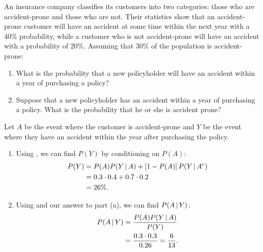 \begin{changebar}
    \begin{example}\label{insuranceconditional}
        An insurance company classifies its customers into two categories: those who are accident-prone and those who are not. Their statistics show that an accident-prone customer will have an accident at some time within the next year with a 40\% probability, while a customer who is not accident-prone will have an accident with a probability of 20\%. Assuming that 30\% of the population is accident-prone: \begin{enumerate}[label=(\alph*)]
            \item What is the probability that a new policyholder will have an accident within a year of purchasing a policy?
            \item Suppose that a new policyholder has an accident within a year of purchasing a policy. What is the probability that he or she is accident prone?
        \end{enumerate}
    \end{example}
    \begin{solution}
        Let $A$ be the event where the customer is accident-prone and $Y$ be the event where they have an accident within the year after purchasing the policy.
        \begin{enumerate}[label=(\alph*)]
            \item Using , we can find $P(Y)$ by conditioning on $P(A)$: \[
                    \begin{aligned}
                        P(Y) &= P(A)P(Y \,\vert\, A) + \left[ 1 - P(A) \right]P(Y \,\vert\, A^c) \\
                        &= 0.3\cdot 0.4 + 0.7\cdot 0.2 \\
                        &= 26\%.
                    \end{aligned}
                \]
            \item Using  and our answer to part (a), we can find $P(A \,\vert\, Y)$: \[
                \begin{aligned}
                    P(A \,\vert\, Y) &= \frac{P(A)P(Y \,\vert\, A)}{P(Y)} \\
                    &= \frac{0.3 \cdot 0.3}{0.26} = \frac{6}{13}.
                \end{aligned}
            \]
        \end{enumerate}
    \end{solution}
\end{changebar}
